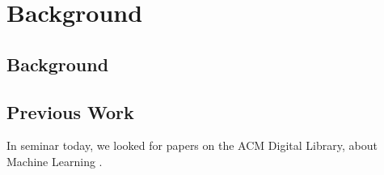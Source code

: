 \chapter{Background}
\label{chap:background}

\section{Background}

\section{Previous Work}

In seminar today, we looked for papers on the ACM Digital Library, about Machine Learning \cite{Tong:2002:SVM:944790.944793}.
